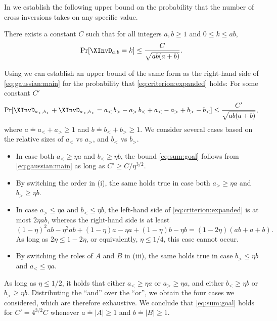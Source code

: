 In  we establish the following upper bound on the probability that the number of cross inversions takes on any specific value.
\begin{lemma}\label{thm:gaussian:main}
There exists a constant $C$ such that for all integers $a,b\ge 1$ and $0\le k\le ab$, 
\begin{equation}\label{eq:gaussian:main}
\Pr[\XInvD_{a,b}=k]\le \frac{C}{\sqrt{ab(a+b)}}. 
\end{equation}
\end{lemma}
Using  we can establish an upper bound of the same form as the right-hand side of \eqref{eq:gaussian:main} for the probability that \eqref{eq:criterion:expanded} holds: For some constant $C'$
\begin{equation}\label{eq:sum:goal}
\Pr[ \XInvD_{a_<,b_<} + \XInvD_{a_>,b_>} = a_< \, b_> - a_> \, b_< + a_< - a_> + b_> - b_<] \le \frac{C'}{\sqrt{ab(a+b)}}, 
\end{equation}
where $a \doteq a_< + a_> \ge 1$ and $b \doteq b_< + b_> \ge 1$.
We consider several cases based on the relative sizes of $a_<$ vs $a_>$, and $b_<$ vs $b_>$.
\begin{itemize}
\item[(i)] In case both $a_< \ge \eta a$ and $b_< \ge \eta b$, the bound \eqref{eq:sum:goal} follows from \eqref{eq:gaussian:main} as long as $C' \ge C / \eta^{3/2}$. 
\item[(ii)] By switching the order in (i), the same holds true in case both $a_> \ge \eta a$ and $b_> \ge \eta b$.
\item[(iii)] In case $a_> \le \eta a$ and $b_< \le \eta b$, the left-hand side of \eqref{eq:criterion:expanded} is at most $2 \eta ab$, whereas the right-hand side is at least
\[ (1-\eta)^2 ab - \eta^2 ab + (1-\eta)a - \eta a + (1-\eta)b - \eta b 
= (1-2\eta)(ab+a+b). \]
As long as $2 \eta \le 1-2\eta$, or equivalently, $\eta \le 1/4$, this case cannot occur.
\item[(iv)] By switching the roles of $A$ and $B$ in (iii), the same holds true in case $b_> \le \eta b$ and $a_< \le \eta a$.
\end{itemize}
As long as $\eta \le 1/2$, it holds that either $a_< \ge \eta a$ or $a_> \ge \eta a$, and either $b_< \ge \eta b$ or $b_> \ge \eta b$. 
Distributing the “and” over the “or”, we obtain the four cases we considered, which are therefore exhaustive. We conclude that \eqref{eq:sum:goal} holds for $C' = 4^{3/2} C$ whenever $a \doteq |A| \ge 1$ and $b \doteq |B| \ge 1$. 

